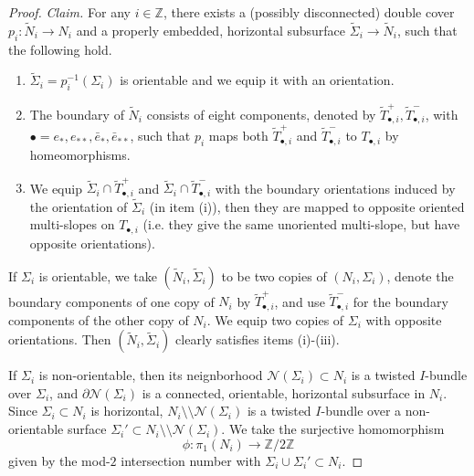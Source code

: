 \documentclass{amsart}
\numberwithin{equation}{section}
\theoremstyle{definition}
\begin{document}
\begin{proof}
{\it Claim.} For any $i\in \mathbb{Z}$, there exists a (possibly disconnected) double cover $p_i:\tilde{N}_i\to N_i$ and a properly embedded, horizontal subsurface $\tilde{\Sigma}_i\to \tilde{N}_i$, such that the following hold.
\begin{enumerate}
\item[(i)] $\tilde{\Sigma}_i=p_i^{-1}(\Sigma_i)$ is orientable and we equip it with an orientation.
\item[(ii)] The boundary of $\tilde{N}_i$ consists of eight components, denoted by $\tilde{T}_{\bullet,i}^+,\tilde{T}_{\bullet,i}^-$, with $\bullet=e_*,e_{**},\bar{e}_*,\bar{e}_{**}$, such that $p_i$ maps both $\tilde{T}_{\bullet,i}^+$ and $\tilde{T}_{\bullet,i}^-$ to $T_{\bullet,i}$ by homeomorphisms.
\item[(iii)] We equip $\tilde{\Sigma}_i\cap \tilde{T}_{\bullet,i}^+$ and $\tilde{\Sigma}_i\cap \tilde{T}_{\bullet,i}^-$ with the boundary orientations induced by the orientation of $\tilde{\Sigma}_i$ (in item (i)), then they are mapped to opposite oriented multi-slopes on $T_{\bullet,i}$ (i.e. they give the same unoriented multi-slope, but have opposite orientations).
\end{enumerate}


If $\Sigma_i$ is orientable, we take $(\tilde{N}_i,\tilde{\Sigma}_i)$ to be two copies of $(N_i,\Sigma_i)$, denote the boundary components of one copy of $N_i$ by $\tilde{T}_{\bullet,i}^+$, and use $\tilde{T}_{\bullet,i}^-$ for the boundary components of the other copy of $N_i$. We equip two copies of $\Sigma_i$ with opposite orientations. Then $(\tilde{N}_i,\tilde{\Sigma}_i)$ clearly satisfies items (i)-(iii).

If $\Sigma_i$ is non-orientable, then its neignborhood $\mathcal{N}(\Sigma_i)\subset N_i$ is a twisted $I$-bundle over $\Sigma_i$, and $\partial \mathcal{N}(\Sigma_i)$ is a connected, orientable, horizontal subsurface in $N_i$. Since $\Sigma_i \subset N_i$ is horizontal, $N_i\setminus\setminus \mathcal{N}(\Sigma_i)$ is a twisted $I$-bundle over a non-orientable surface $\Sigma_i'\subset N_i\setminus\setminus \mathcal{N}(\Sigma_i)$. We take the surjective homomorphism 
$$\phi:\pi_1(N_i)\to \mathbb{Z}/2\mathbb{Z}$$ 
given by the mod-$2$ intersection number with $\Sigma_i\cup \Sigma_i'\subset N_i$.


\end{proof}
\end{document}
